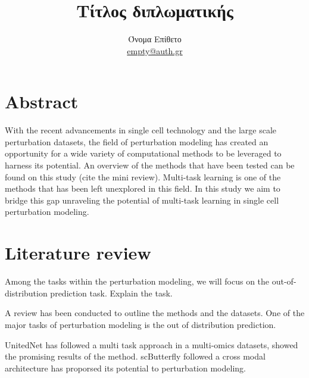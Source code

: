 \documentclass[12pt, a4paper]{report}
\begin{document}


\title{Τίτλος διπλωματικής}
\author{Όνομα Επίθετο \\
\href{mailto:empty@auth.gr}{empty@auth.gr}}
\maketitle

{
\renewcommand*\contentsname{Περιεχόμενα}
\hypersetup{linkcolor=black}
\tableofcontents
}

\thispagestyle{empty}

\clearpage

\section{Abstract}

With the recent advancements in single cell technology and the large scale perturbation datasets, the field of perturbation modeling \cite{jiMachineLearningPerturbational2021} has created an opportunity for a wide variety of computational methods to be leveraged to harness its potential. An overview of the methods that have been tested can be found on this study (cite the mini review). Multi-task learning is one of the methods that has been left unexplored in this field. In this study we aim to bridge this gap unraveling the potential of multi-task learning in single cell perturbation modeling.

\section{Literature review}


Among the tasks within the perturbation modeling, we will focus on the out-of-distribution prediction task. Explain the task.


A review has been conducted to outline the methods and the datasets. One of the major tasks of perturbation modeling is the out of distribution prediction. 


UnitedNet has followed a multi task approach in a multi-omics datasets, showed the promising results of the method. scButterfly followed a cross modal architecture has proporsed its potential to perturbation modeling.
\end{document}
